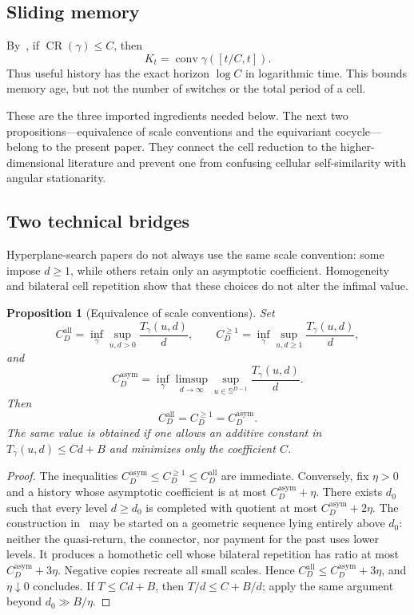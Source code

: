 \documentclass[10pt,a4paper]{article}
\newcommand{\Sph}{\mathbb{S}}
\newcommand{\conv}{\operatorname{conv}}
\newcommand{\CR}{\operatorname{CR}}
\theoremstyle{plain}
\newtheorem{proposition}[theorem]{Proposition}
\theoremstyle{definition}
\theoremstyle{remark}
\begin{document}
\subsection{Sliding memory}

By~\cite[Theorem~12.2]{koch-cell}, if $\CR(\gamma)\le C$, then
\[
  K_t=\conv\gamma([t/C,t]).
\]
Thus useful history has the exact horizon $\log C$ in logarithmic time. This bounds memory age, but not the number of switches or the total period of a cell.

These are the three imported ingredients needed below. The next two propositions---equivalence of scale conventions and the equivariant cocycle---belong to the present paper. They connect the cell reduction to the higher-dimensional literature and prevent one from confusing cellular self-similarity with angular stationarity.

\subsection{Two technical bridges}

Hyperplane-search papers do not always use the same scale convention: some impose $d\ge1$, while others retain only an asymptotic coefficient. Homogeneity and bilateral cell repetition show that these choices do not alter the infimal value.

\begin{proposition}[Equivalence of scale conventions]
Set
\[
  C_D^{\mathrm{all}}
  =\inf_\gamma\sup_{u,d>0}\frac{T_\gamma(u,d)}{d},
  \qquad
  C_D^{\ge1}
  =\inf_\gamma\sup_{u,d\ge1}\frac{T_\gamma(u,d)}{d},
\]
and
\[
  C_D^{\mathrm{asym}}
  =\inf_\gamma\limsup_{d\to\infty}
  \sup_{u\in\Sph^{D-1}}\frac{T_\gamma(u,d)}{d}.
\]
Then
\[
  C_D^{\mathrm{all}}=C_D^{\ge1}=C_D^{\mathrm{asym}}.
\]
The same value is obtained if one allows an additive constant in $T_\gamma(u,d)\le Cd+B$ and minimizes only the coefficient $C$.
\end{proposition}

\begin{proof}
The inequalities $C_D^{\mathrm{asym}}\le C_D^{\ge1}\le C_D^{\mathrm{all}}$ are immediate. Conversely, fix $\eta>0$ and a history whose asymptotic coefficient is at most $C_D^{\mathrm{asym}}+\eta$. There exists $d_0$ such that every level $d\ge d_0$ is completed with quotient at most $C_D^{\mathrm{asym}}+2\eta$. The construction in~\cite[Theorem~4.1]{koch-cell} may be started on a geometric sequence lying entirely above $d_0$: neither the quasi-return, the connector, nor payment for the past uses lower levels. It produces a homothetic cell whose bilateral repetition has ratio at most $C_D^{\mathrm{asym}}+3\eta$. Negative copies recreate all small scales. Hence $C_D^{\mathrm{all}}\le C_D^{\mathrm{asym}}+3\eta$, and $\eta\downarrow0$ concludes. If $T\le Cd+B$, then $T/d\le C+B/d$; apply the same argument beyond $d_0\gg B/\eta$.
\end{proof}
\end{document}
